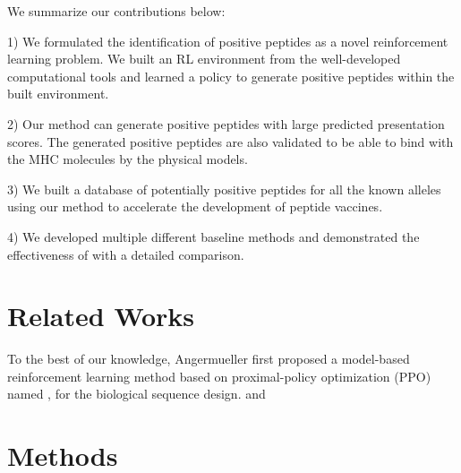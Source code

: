 \documentclass[letterpaper]{article}
\begin{document}
We summarize our contributions below:

1) We formulated the identification of positive peptides as a novel reinforcement learning problem. We built 
an RL environment from the well-developed computational tools and learned a policy to generate positive peptides
within the built environment.

2) Our method can generate positive peptides with large predicted presentation scores. The generated 
positive peptides are also validated to be able to bind with the MHC molecules by the physical models.

3) We built a database of potentially positive peptides for all the known alleles using our method to accelerate 
the development of peptide vaccines.

4) We developed multiple different baseline methods and demonstrated the effectiveness of \pepppo with a detailed comparison.

\section{Related Works}
\label{sec:related}

To the best of our knowledge, Angermueller \etal \cite{angerm2020} first proposed a model-based reinforcement 
learning method based on proximal-policy optimization (PPO) named \dynappo, for the biological sequence design.
%
\dynappo 
and \cite{marcin2020}

\section{Methods}
\label{sec:method}

\end{document}
